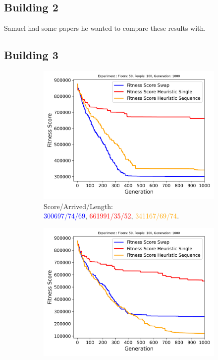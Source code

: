 \subsection{Building 2}
Samuel had some papers he wanted to compare these results with.

\subsection{Building 3}
\begin{figure}[ht]
	\centering
	\begin{subfigure}[b]{0.49\linewidth}
		\centering
		\includegraphics[width=\linewidth]{results/Building3/Mutation_0.1/Floors: 50, People: 100, Generation: 1000_4_worst.png}
		\captionsetup{justification=centering,font=tiny}
		\caption{Score/Arrived/Length:\\\textcolor{blue}{300697/74/69}, \textcolor{red}{661991/35/52}, \textcolor{orange}{341167/69/74}.}
		\label{fig:Building3/Mutation_0.1/Floors: 50, People: 100, Generation: 1000_4_worst}
	\end{subfigure}
	\hfill
	\begin{subfigure}[b]{0.49\linewidth}
		\centering
		\includegraphics[width=\linewidth]{results/Building3/Mutation_0.1/Floors: 50, People: 100, Generation: 1000_1_best.png}

\end{subfigure}
\end{figure}
